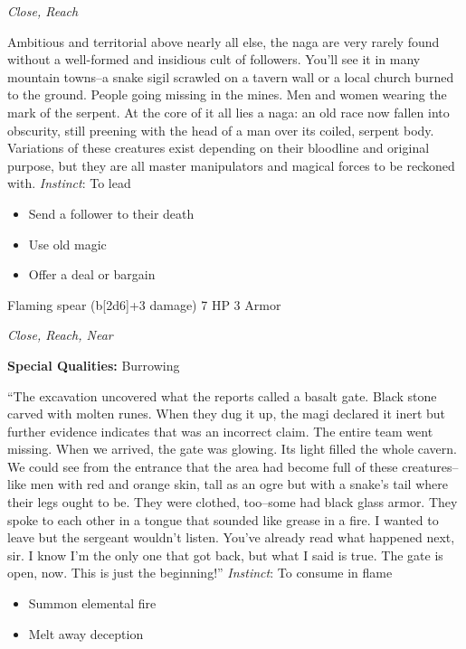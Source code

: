 \emph{Close, Reach}

\HRule
Ambitious and territorial above nearly all else, the naga are very rarely found without a well-formed and insidious cult of followers. You'll see it in many mountain towns--a snake sigil scrawled on a tavern wall or a local church burned to the ground. People going missing in the mines. Men and women wearing the mark of the serpent. At the core of it all lies a naga: an old race now fallen into obscurity, still preening with the head of a man over its coiled, serpent body. Variations of these creatures exist depending on their bloodline and original purpose, but they are all master manipulators and magical forces to be reckoned with. \emph{Instinct}: To lead
\begin{itemize}
\item Send a follower to their death
\item Use old magic
\item Offer a deal or bargain
\end{itemize}
\newpage
\HRule
{}

Flaming spear (b[2d6]+3 damage)\hspace*{\fill} 7 HP 3 Armor

\emph{Close, Reach, Near}

\textbf{Special Qualities:}
Burrowing

\HRule
``The excavation uncovered what the reports called a basalt gate. Black stone carved with molten runes. When they dug it up, the magi declared it inert but further evidence indicates that was an incorrect claim. The entire team went missing. When we arrived, the gate was glowing. Its light filled the whole cavern. We could see from the entrance that the area had become full of these creatures--like men with red and orange skin, tall as an ogre but with a snake's tail where their legs ought to be. They were clothed, too--some had black glass armor. They spoke to each other in a tongue that sounded like grease in a fire. I wanted to leave but the sergeant wouldn't listen. You've already read what happened next, sir. I know I'm the only one that got back, but what I said is true. The gate is open, now. This is just the beginning!'' \emph{Instinct}: To consume in flame
\begin{itemize}
\item Summon elemental fire
\item Melt away deception
\end{itemize}
